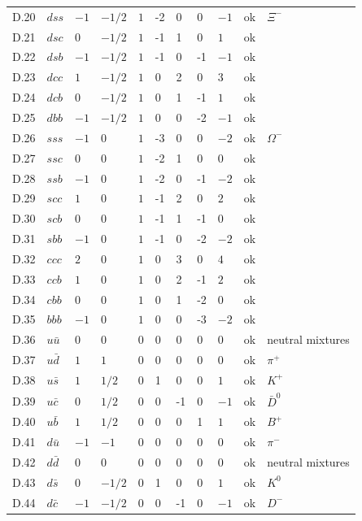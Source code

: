 {\begin{longtable}{@{}llllllllll>{\raggedright\arraybackslash}p{3.2cm}@{}}
D.20 & $dss$ & $-1$ & $-1/2$ & $1$ & -2 & 0 & 0 & $-1$ & ok & $\Xi^-$ \\
D.21 & $dsc$ & $0$ & $-1/2$ & $1$ & -1 & 1 & 0 & $1$ & ok &  \\
D.22 & $dsb$ & $-1$ & $-1/2$ & $1$ & -1 & 0 & -1 & $-1$ & ok &  \\
D.23 & $dcc$ & $1$ & $-1/2$ & $1$ & 0 & 2 & 0 & $3$ & ok &  \\
D.24 & $dcb$ & $0$ & $-1/2$ & $1$ & 0 & 1 & -1 & $1$ & ok &  \\
D.25 & $dbb$ & $-1$ & $-1/2$ & $1$ & 0 & 0 & -2 & $-1$ & ok &  \\
D.26 & $sss$ & $-1$ & $0$ & $1$ & -3 & 0 & 0 & $-2$ & ok & $\Omega^-$ \\
D.27 & $ssc$ & $0$ & $0$ & $1$ & -2 & 1 & 0 & $0$ & ok &  \\
D.28 & $ssb$ & $-1$ & $0$ & $1$ & -2 & 0 & -1 & $-2$ & ok &  \\
D.29 & $scc$ & $1$ & $0$ & $1$ & -1 & 2 & 0 & $2$ & ok &  \\
D.30 & $scb$ & $0$ & $0$ & $1$ & -1 & 1 & -1 & $0$ & ok &  \\
D.31 & $sbb$ & $-1$ & $0$ & $1$ & -1 & 0 & -2 & $-2$ & ok &  \\
D.32 & $ccc$ & $2$ & $0$ & $1$ & 0 & 3 & 0 & $4$ & ok &  \\
D.33 & $ccb$ & $1$ & $0$ & $1$ & 0 & 2 & -1 & $2$ & ok &  \\
D.34 & $cbb$ & $0$ & $0$ & $1$ & 0 & 1 & -2 & $0$ & ok &  \\
D.35 & $bbb$ & $-1$ & $0$ & $1$ & 0 & 0 & -3 & $-2$ & ok &  \\
D.36 & $u\bar{u}$ & $0$ & $0$ & $0$ & 0 & 0 & 0 & $0$ & ok & neutral mixtures \\
D.37 & $u\bar{d}$ & $1$ & $1$ & $0$ & 0 & 0 & 0 & $0$ & ok & $\pi^+$ \\
D.38 & $u\bar{s}$ & $1$ & $1/2$ & $0$ & 1 & 0 & 0 & $1$ & ok & $K^+$ \\
D.39 & $u\bar{c}$ & $0$ & $1/2$ & $0$ & 0 & -1 & 0 & $-1$ & ok & $\bar D^0$ \\
D.40 & $u\bar{b}$ & $1$ & $1/2$ & $0$ & 0 & 0 & 1 & $1$ & ok & $B^+$ \\
D.41 & $d\bar{u}$ & $-1$ & $-1$ & $0$ & 0 & 0 & 0 & $0$ & ok & $\pi^-$ \\
D.42 & $d\bar{d}$ & $0$ & $0$ & $0$ & 0 & 0 & 0 & $0$ & ok & neutral mixtures \\
D.43 & $d\bar{s}$ & $0$ & $-1/2$ & $0$ & 1 & 0 & 0 & $1$ & ok & $K^0$ \\
D.44 & $d\bar{c}$ & $-1$ & $-1/2$ & $0$ & 0 & -1 & 0 & $-1$ & ok & $D^-$ \\

\end{longtable}}

